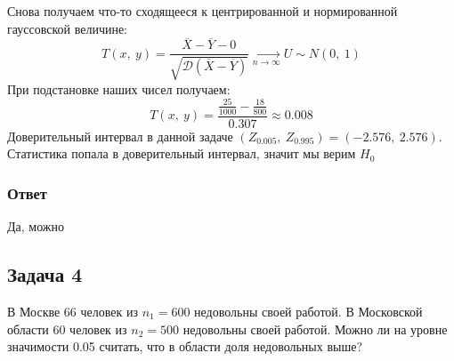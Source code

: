 \documentclass[12pt, a4paper]{article}
\newcommand{\dev}{\mathcal{D}}
\begin{document}
Снова получаем что-то сходящееся к центрированной и нормированной гауссовской величине:
\[T(x,\ y) = \frac{\overline{X} - \overline{Y} - 0}{\sqrt{\dev\left( \overline{X} - \overline{Y} \right)}} \xrightarrow[n\to\infty]{}U\sim N(0,\ 1)\]
При подстановке наших чисел получаем:
\[T(x,\ y) = \frac{\frac{25}{1000} - \frac{18}{800}}{0.307} \approx 0.008\]
Доверительный интервал в данной задаче $(Z_{0.005},\ Z_{0.995}) = (-2.576,\ 2.576)$. Статистика попала в доверительный интервал, значит мы верим $H_0$
\subsubsection*{Ответ}
Да, можно
\subsection*{Задача 4}
В Москве 66 человек из $n_1 = 600$ недовольны своей работой. В Московской области 60 человек из $n_2 = 500$ недовольны своей работой. Можно ли на уровне значимости 0.05 считать, что в области доля недовольных выше?
\end{document}
